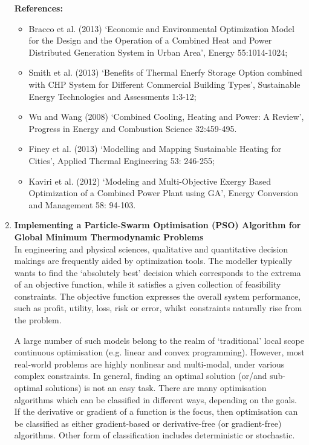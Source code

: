 \documentclass[12pts,a4paper,amsmath,amssymb,floatfix]{article}%
\begin{document}
\begin{enumerate}[label=\bfseries Project: \arabic*:]
\noindent
{\bf References:}
\begin{itemize}
\item Bracco et al. (2013) `Economic and Environmental Optimization Model for the Design and the Operation of a Combined Heat and Power Distributed Generation System in Urban Area’, Energy 55:1014-1024;
\item Smith et al. (2013) `Benefits of Thermal Enerfy Storage Option combined with CHP System for Different Commercial Building Types’, Sustainable Energy Technologies and Assessments 1:3-12;
\item Wu and Wang (2008) `Combined Cooling, Heating and Power: A Review’, Progress in Energy and Combustion Science 32:459-495.
\item Finey et al. (2013) `Modelling and Mapping Sustainable Heating for Cities’, Applied Thermal Engineering 53: 246-255;
\item Kaviri et al. (2012) `Modeling and Multi-Objective Exergy Based Optimization of a Combined Power Plant using GA’, Energy Conversion and Management 58: 94-103.
\end{itemize}

\clearpage

\item {\bf Implementing a Particle-Swarm Optimisation (PSO) Algorithm for Global Minimum Thermodynamic Problems} \\

In engineering and physical sciences, qualitative and quantitative decision makings are frequently aided by optimization tools. The modeller typically wants to find the `absolutely best’ decision which corresponds to the extrema of an objective function, while it satisfies a given collection of feasibility constraints. The objective function expresses the overall system performance, such as profit, utility, loss, risk or error, whilst constraints naturally rise from the problem.

A large number of such models belong to the realm of `traditional' local scope continuous optimisation (e.g. linear and convex programming). However, most real-world problems are highly nonlinear and multi-modal, under various complex constraints. In general, finding an optimal solution (or/and sub-optimal solutions) is not an easy task. There are many optimisation algorithms which can be classified in different ways, depending on the goals. If the derivative or gradient of a function is the focus, then optimisation can be classified as either gradient-based or derivative-free (or gradient-free) algorithms. Other form of classification includes deterministic or stochastic.


\end{enumerate}
\end{document}
